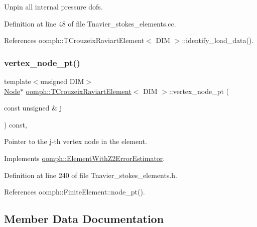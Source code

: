 Unpin all internal pressure dofs. 



Definition at line 48 of file Tnavier\+\_\+stokes\+\_\+elements.\+cc.



References oomph\+::\+T\+Crouzeix\+Raviart\+Element$<$ D\+I\+M $>$\+::identify\+\_\+load\+\_\+data().

\mbox{\label{classoomph_1_1TCrouzeixRaviartElement_af40208fa7a6f30f2b4dc9c3a19d645e2}} 
\subsubsection{\texorpdfstring{vertex\+\_\+node\+\_\+pt()}{vertex\_node\_pt()}}
{\footnotesize\ttfamily template$<$unsigned D\+IM$>$ \\
\hyperlink{classoomph_1_1Node}{Node}$\ast$ \hyperlink{classoomph_1_1TCrouzeixRaviartElement}{oomph\+::\+T\+Crouzeix\+Raviart\+Element}$<$ D\+IM $>$\+::vertex\+\_\+node\+\_\+pt (\begin{DoxyParamCaption}\item[{const unsigned \&}]{j }\end{DoxyParamCaption}) const\hspace{0.3cm}{\ttfamily [inline]}, {\ttfamily [virtual]}}



Pointer to the j-\/th vertex node in the element. 



Implements \hyperlink{classoomph_1_1ElementWithZ2ErrorEstimator_a0eedccc33519f852c5dc2055ddf2774b}{oomph\+::\+Element\+With\+Z2\+Error\+Estimator}.



Definition at line 240 of file Tnavier\+\_\+stokes\+\_\+elements.\+h.



References oomph\+::\+Finite\+Element\+::node\+\_\+pt().



\subsection{Member Data Documentation}
\mbox{\label{classoomph_1_1TCrouzeixRaviartElement_a2cbeaf78ee0aeef8308c7356563edcdf}} 
